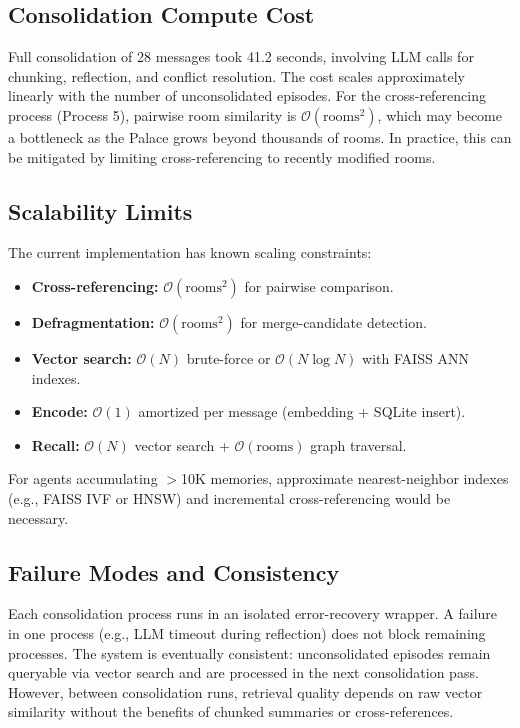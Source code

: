 \documentclass[conference]{IEEEtran}
\begin{document}
\subsection{Consolidation Compute Cost}
Full consolidation of 28 messages took 41.2 seconds, involving LLM calls for chunking, reflection, and conflict resolution. The cost scales approximately linearly with the number of unconsolidated episodes. For the cross-referencing process (Process 5), pairwise room similarity is $\mathcal{O}(\text{rooms}^2)$, which may become a bottleneck as the Palace grows beyond thousands of rooms. In practice, this can be mitigated by limiting cross-referencing to recently modified rooms.

\subsection{Scalability Limits}
The current implementation has known scaling constraints:
\begin{itemize}
    \item \textbf{Cross-referencing:} $\mathcal{O}(\text{rooms}^2)$ for pairwise comparison.
    \item \textbf{Defragmentation:} $\mathcal{O}(\text{rooms}^2)$ for merge-candidate detection.
    \item \textbf{Vector search:} $\mathcal{O}(N)$ brute-force or $\mathcal{O}(N \log N)$ with FAISS ANN indexes.
    \item \textbf{Encode:} $\mathcal{O}(1)$ amortized per message (embedding + SQLite insert).
    \item \textbf{Recall:} $\mathcal{O}(N)$ vector search + $\mathcal{O}(\text{rooms})$ graph traversal.
\end{itemize}
For agents accumulating $>$10K memories, approximate nearest-neighbor indexes (e.g., FAISS IVF or HNSW) and incremental cross-referencing would be necessary.

\subsection{Failure Modes and Consistency}
Each consolidation process runs in an isolated error-recovery wrapper. A failure in one process (e.g., LLM timeout during reflection) does not block remaining processes. The system is eventually consistent: unconsolidated episodes remain queryable via vector search and are processed in the next consolidation pass. However, between consolidation runs, retrieval quality depends on raw vector similarity without the benefits of chunked summaries or cross-references.
\end{document}
